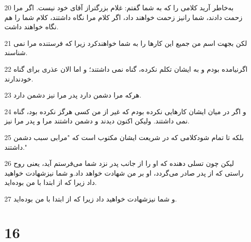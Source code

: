 \par 20 به‌خاطر آرید کلامی را که به شما گفتم: غلام بزرگتراز آقای خود نیست. اگر مرا زحمت دادند، شما رانیز زحمت خواهند داد، اگر کلام مرا نگاه داشتند، کلام شما را هم نگاه خواهند داشت.
\par 21 لکن بجهت اسم من جمیع این کارها را به شما خواهندکرد زیرا که فرستنده مرا نمی شناسند.
\par 22 اگرنیامده بودم و به ایشان تکلم نکرده، گناه نمی داشتند؛ و اما الان عذری برای گناه خودندارند.
\par 23 هر‌که مرا دشمن دارد پدر مرا نیز دشمن دارد.
\par 24 و اگر در میان ایشان کارهایی نکرده بودم که غیر از من کسی هرگز نکرده بود، گناه نمی داشتند. ولیکن اکنون دیدند و دشمن داشتند مرا و پدر مرا نیز.
\par 25 بلکه تا تمام شودکلامی که در شریعت ایشان مکتوب است که "مرابی سبب دشمن داشتند."
\par 26 لیکن چون تسلی دهنده که او را از جانب پدر نزد شما می‌فرستم آید، یعنی روح راستی که از پدر صادر می‌گردد، او بر من شهادت خواهد داد.و شما نیزشهادت خواهید داد زیرا که از ابتدا با من بوده‌اید.
\par 27 و شما نیزشهادت خواهید داد زیرا که از ابتدا با من بوده‌اید.

\chapter{16}

